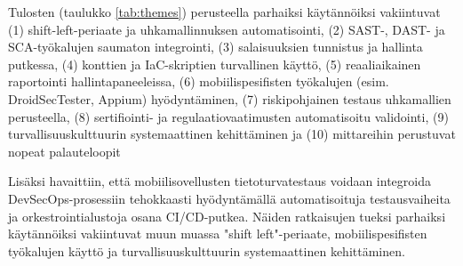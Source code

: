 \documentclass[bscthesis,finnish,oneside,biblatex]{uefcsthesis}
\begin{document}
    Tulosten (taulukko \ref{tab:themes}) perusteella parhaiksi käytännöiksi vakiintuvat (1) shift-left-periaate ja uhkamallinnuksen automatisointi, (2) SAST-, DAST- ja SCA-työkalujen saumaton integrointi, (3) salaisuuksien tunnistus ja hallinta putkessa, (4) konttien ja IaC-skriptien turvallinen käyttö, (5) reaaliaikainen raportointi hallintapaneeleissa, (6) mobiilispesifisten työkalujen (esim. DroidSecTester, Appium) hyödyntäminen, (7) riskipohjainen testaus uhkamallien perusteella, (8) sertifiointi- ja regulaatiovaatimusten automatisoitu validointi, (9) turvallisuuskulttuurin systemaattinen kehittäminen ja (10) mittareihin perustuvat nopeat palauteloopit %

    Lisäksi havaittiin, että mobiilisovellusten tietoturvatestaus voidaan integroida DevSecOps-prosessiin tehokkaasti hyödyntämällä automatisoituja testausvaiheita ja orkestrointialustoja osana CI/CD-putkea. Näiden ratkaisujen tueksi parhaiksi käytännöiksi vakiintuvat muun muassa "shift left"-periaate, mobiilispesifisten työkalujen käyttö ja turvallisuuskulttuurin systemaattinen kehittäminen.
\end{document}

